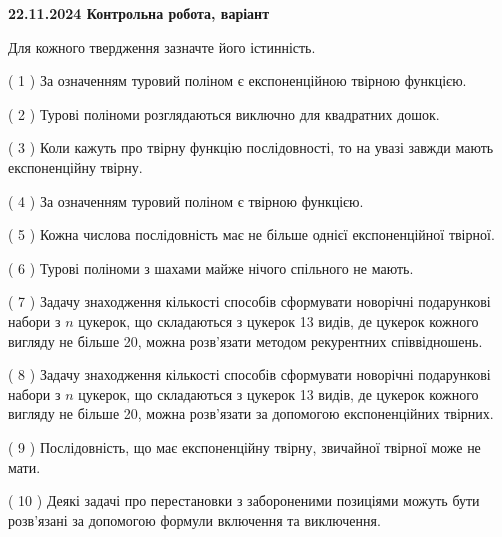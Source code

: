 \documentclass[12pt, ukrainian]{article}
\begin{document}
\vspace{4mm}
\newpage
\begin {large}

\textbf{22.11.2024 Контрольна робота, варіант  }\par


{
Для кожного твердження зазначте його істинність.\par
\vspace{2mm}
( 1 ) За означенням туровий поліном є експоненційною твірною функцією.%

( 2 ) Турові поліноми розглядаються виключно для квадратних дошок.%

( 3 ) Коли кажуть про твірну функцію послідовності, то на увазі завжди мають експоненційну твірну.%

( 4 ) За означенням туровий поліном є твірною функцією.%

( 5 ) Кожна числова послідовність має не більше однієї  експоненційної твірної.%

( 6 ) Турові поліноми з шахами майже нічого спільного не мають.%

( 7 ) Задачу знаходження кількості способів сформувати новорічні подарункові набори з $n$ цукерок, що складаються з цукерок 13 видів, де цукерок кожного вигляду не більше 20, можна розв’язати методом рекурентних співвідношень.%

( 8 ) Задачу знаходження кількості способів сформувати новорічні подарункові набори з $n$ цукерок, що складаються з цукерок 13 видів, де цукерок кожного вигляду не більше 20, можна розв’язати за допомогою експоненційних твірних.%

( 9 ) Послідовність, що має експоненційну твірну, звичайної твірної може не мати.%

( 10 ) Деякі задачі про перестановки з забороненими позиціями можуть бути розв’я\-за\-ні за допомогою формули включення та виключення.%


\vspace{5mm}
}
\end {large}
\end{document}
